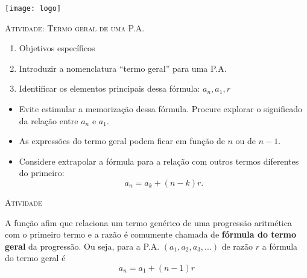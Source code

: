 \documentclass[10 pt,usenames,dvipsnames, oneside]{article}
\begin{document}
\begin{center}
  \begin{minipage}[l]{3cm}
\texttt{[image: logo]}    
\end{minipage}\hfill
\begin{minipage}[r]{.8\textwidth}
 {\Large \scshape Atividade: Termo geral de uma P.A.}  
\end{minipage}
\end{center}
\vspace{.2cm}

\ifdefined\prof
\begin{objetivos}
\item \phantom{a}
\end{objetivos}

\begin{goals}
\begin{enumerate}
\item Objetivos específicos
\item Introduzir a nomenclatura “termo geral” para uma P.A.
\item Identificar os elementos principais dessa fórmula: $a_n, a_1,r$
\end{enumerate}

\tcblower

\begin{itemize}
\item Evite estimular a memorização dessa fórmula. Procure explorar o significado da relação entre $a_n$ e $a_1$.
\item As expressões do termo geral podem ficar em função de $n$ ou de $n-1$.
\item Considere extrapolar a fórmula para a relação com outros termos diferentes do primeiro:
\begin{equation*}
a_n=a_k+(n-k)r.
\end{equation*}

\end{itemize}

\end{goals}

\bigskip
\begin{center}
{\large \scshape Atividade}
\end{center}
\fi

A função afim que relaciona um termo genérico de uma progressão aritmética com o primeiro termo e a razão é comumente chamada de \textbf{fórmula do termo geral} da progressão. Ou seja, para a P.A. $(a_1,a_2,a_3,...)$ de razão $r$ a fórmula do termo geral é
\begin{equation*}
a_n=a_1+(n-1)r
\end{equation*}
\end{document}
